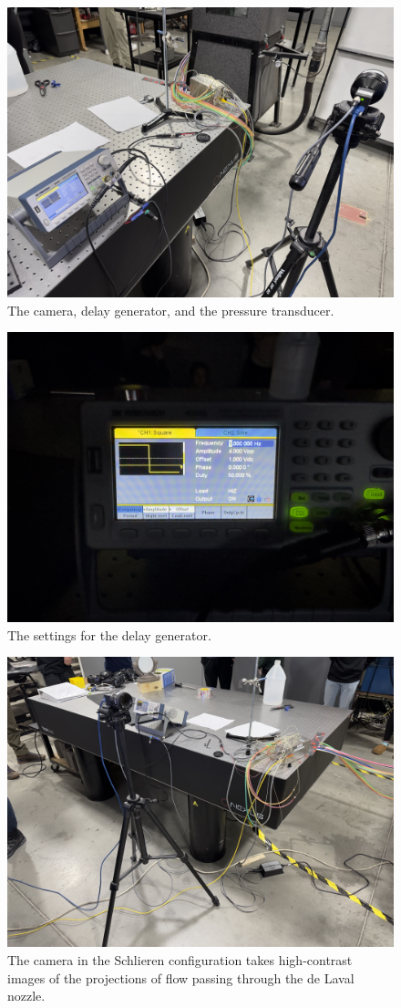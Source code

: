 \begin{figure}[htpb]
    \centering
    \includegraphics[width=0.75\linewidth]{Figures/delay_generator_and_schlieren.jpeg}
    \caption{The camera, delay generator, and the pressure transducer.}
    \label{fig:delay_generator}
\end{figure}

\begin{figure}[htpb]
    \centering
    \includegraphics[width=0.75\linewidth]{Figures/delay_generator_settings.jpeg}
    \caption{The settings for the delay generator.}
    \label{fig:delay_generator_settings}
\end{figure}

\begin{figure}[htpb]
    \centering
    \includegraphics[width=0.75\linewidth]{Figures/camera.jpeg}
    \caption{The camera in the Schlieren configuration takes high-contrast images of the projections of flow passing through the de Laval nozzle.}
    \label{fig:camera}
\end{figure}

